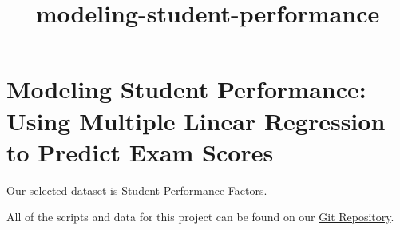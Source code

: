 \documentclass[11pt]{article}
\title{modeling-student-performance}
\begin{document}
    
    \maketitle
    
    

    
    \section{Modeling Student Performance: Using Multiple Linear Regression
to Predict Exam
Scores}\label{modeling-student-performance-using-multiple-linear-regression-to-predict-exam-scores}

    Our selected dataset is
\href{https://www.kaggle.com/datasets/lainguyn123/student-performance-factors}{Student
Performance Factors}.

All of the scripts and data for this project can be found on our
\href{https://github.com/cztm/linear-regression}{Git Repository}.
\end{document}
